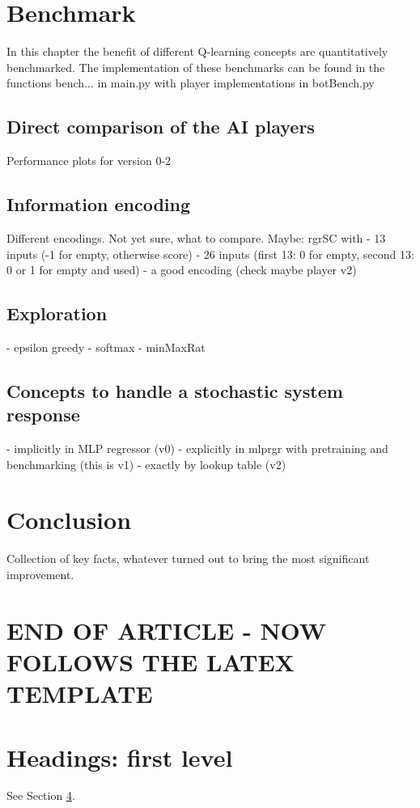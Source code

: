\documentclass{article}
\begin{document}
\section{Benchmark}
In this chapter the benefit of different Q-learning concepts are quantitatively benchmarked.
The implementation of these benchmarks can be found in the functions bench... in main.py with player implementations in botBench.py

\subsection{Direct comparison of the AI players}
Performance plots for version 0-2
\subsection{Information encoding}
Different encodings. Not yet sure, what to compare.
Maybe: rgrSC with 
- 13 inputs (-1 for empty, otherwise score)
- 26 inputs (first 13: 0 for empty, second 13: 0 or 1 for empty and used)
- a good encoding (check maybe player v2)
\subsection{Exploration}
- epsilon greedy
- softmax
- minMaxRat
\subsection{Concepts to handle a stochastic system response}
- implicitly in MLP regressor (v0)
- explicitly in mlprgr with pretraining and benchmarking (this is v1)
- exactly by lookup table (v2)


\section{Conclusion}
Collection of key facts, whatever turned out to bring the most significant improvement.


\pagebreak
\section{END OF ARTICLE - NOW FOLLOWS THE LATEX TEMPLATE}

\section{Headings: first level}
\label{sec:headings}

\lipsum[4] See Section \ref{sec:headings}.
\end{document}

